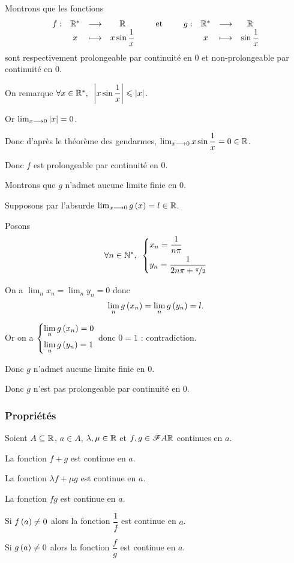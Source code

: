 \begin{ex}
Montrons que les fonctions \[\begin{array}[t]{cccc}f : & \mathbb{R}^* & \longrightarrow & \mathbb{R} \\ & x & \longmapsto & x\sin\dfrac{1}{x}\end{array}\qquad\text{et}\qquad\begin{array}[t]{cccc}g : & \mathbb{R}^* & \longrightarrow & \mathbb{R} \\ & x & \longmapsto & \sin\dfrac{1}{x}\end{array}\] sont respectivement prolongeable par continuité en \(0\) et non-prolongeable par continuité en \(0\).

On remarque \(\quantifs{\forall x\in\Rs}\abs{x\sin\dfrac{1}{x}}\leq\abs{x}\).

Or \(\lim_{x\longrightarrow0}\left\lvert x\right\rvert=0\).

Donc d'après le théorème des gendarmes, \(\lim_{x\longrightarrow0}x\sin\dfrac{1}{x}=0\in\mathbb{R}\).

Donc \(f\) est prolongeable par continuité en \(0\).

Montrons que \(g\) n'admet aucune limite finie en \(0\).

Supposons par l'absurde \(\lim_{x\longrightarrow0}g\left(x\right)=l\in\mathbb{R}\).

Posons \[\quantifs{\forall n\in\Ns}\begin{dcases}x_n=\dfrac{1}{n\pi} \\ y_n=\dfrac{1}{2n\pi+\nicefrac{\pi}{2}}\end{dcases}\]

On a \(\lim_nx_n=\lim_ny_n=0\) donc \[\lim_ng\left(x_n\right)=\lim_ng\left(y_n\right)=l.\]

Or on a \(\begin{dcases}\lim_ng\left(x_n\right)=0 \\ \lim_ng\left(y_n\right)=1\end{dcases}\) donc \(0=1\) : contradiction.

Donc \(g\) n'admet aucune limite finie en \(0\).

Donc \(g\) n'est pas prolongeable par continuité en \(0\).
\end{ex}

\subsubsection{Propriétés}

\begin{prop}
Soient \(A\subseteq\mathbb{R}\), \(a\in A\), \(\lambda,\mu\in\mathbb{R}\) et \(f,g\in\mathscr{F}{A}{\mathbb{R}}\) continues en \(a\).

La fonction \(f+g\) est continue en \(a\).

La fonction \(\lambda f+\mu g\) est continue en \(a\).

La fonction \(fg\) est continue en \(a\).

Si \(f\left(a\right)\not=0\) alors la fonction \(\dfrac{1}{f}\) est continue en \(a\).

Si \(g\left(a\right)\not=0\) alors la fonction \(\dfrac{f}{g}\) est continue en \(a\).
\end{prop}

